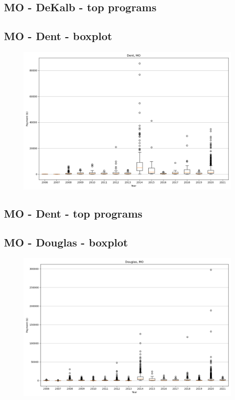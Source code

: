 \subsection*{MO - DeKalb - top programs}

\newpage
\subsection*{MO - Dent - boxplot}
\begin{figure}[h]
\centering
\includegraphics[width=7in]{../output/boxplots/counties/Dent-MO_boxplot.png}
\end{figure}


\subsection*{MO - Dent - top programs}

\newpage
\subsection*{MO - Douglas - boxplot}
\begin{figure}[h]
\centering
\includegraphics[width=7in]{../output/boxplots/counties/Douglas-MO_boxplot.png}
\end{figure}


